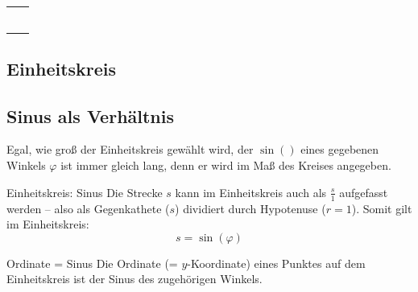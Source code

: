 \begin{tabular}{cc}\makecell{
  $P=(-4 | -4) \TRAINER{=225\degre=-135\degre}$\\
  \miniEinheitskreis{}} &


    \makecell{$P=(-1 | 0)\TRAINER{=180\degre = -180\degre}$\\
  \miniEinheitskreis{}} \\

  \makecell{$P=\left( \frac{\sqrt{3}}2 \bigg| \frac12 \right)\TRAINER{=30\degre}$\\
  \miniEinheitskreis{}} &

    \makecell{$P=\left( \frac{-\sqrt{3}}2 \bigg| \frac12 \right)\TRAINER{=150\degre}$\\
  \miniEinheitskreis{}} \\


\end{tabular}


\newpage
\subsection{Einheitskreis}





\subsection{Sinus als Verhältnis}
Egal, wie groß der Einheitskreis gewählt wird, der $\sin()$ eines
gegebenen Winkels $\varphi$ ist immer gleich lang, denn er wird im Maß
des Kreises angegeben.


\begin{gesetz}{Einheitskreis: Sinus}{}
  Die Strecke $s$ kann im Einheitskreis auch als $\frac{s}1$ aufgefasst werden -- also
  als Gegenkathete ($s$) dividiert durch Hypotenuse ($r=1$). Somit
  gilt im Einheitskreis:
  $$s = \sin(\varphi)$$
\end{gesetz}

\begin{gesetz}{Ordinate = Sinus}{}
  Die Ordinate (= $y$-Koordinate) eines Punktes auf dem Einheitskreis ist
  der Sinus des zugehörigen Winkels.
\end{gesetz}

